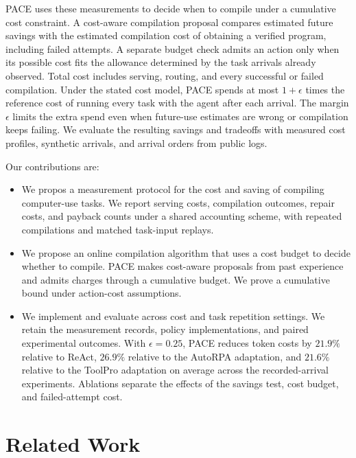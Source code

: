 PACE uses these measurements to decide when to compile under a cumulative cost constraint.
A cost-aware compilation proposal compares estimated future savings with the estimated compilation cost of obtaining a verified program, including failed attempts.
A separate budget check admits an action only when its possible cost fits the allowance determined by the task arrivals already observed.
Total cost includes serving, routing, and every successful or failed compilation.
Under the stated cost model, PACE spends at most $1+\epsilon$ times the reference cost of running every task with the agent after each arrival.
The margin $\epsilon$ limits the extra spend even when future-use estimates are wrong or compilation keeps failing.
We evaluate the resulting savings and tradeoffs with measured cost profiles, synthetic arrivals, and arrival orders from public logs.

Our contributions are:
\begin{itemize}
\item We propos a measurement protocol for the cost and saving of compiling computer-use tasks.
We report serving costs, compilation outcomes, repair costs, and payback counts under a shared accounting scheme, with repeated compilations and matched task-input replays.
\item We propose an online compilation algorithm that uses a cost budget to decide whether to compile.
PACE makes cost-aware proposals from past experience and admits charges through a cumulative budget.
We prove a cumulative bound under action-cost assumptions.
\item We implement and evaluate across cost and task repetition settings.
We retain the measurement records, policy implementations, and paired experimental outcomes.
With $\epsilon=0.25$, PACE reduces token costs by $21.9\%$ relative to ReAct, $26.9\%$ relative to the AutoRPA adaptation, and $21.6\%$ relative to the ToolPro adaptation on average across the recorded-arrival experiments.
Ablations separate the effects of the savings test, cost budget, and failed-attempt cost.
\end{itemize}






\section{Related Work}
\label{sec:related}

